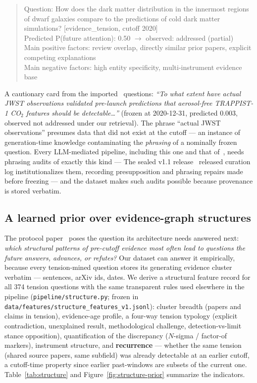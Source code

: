 \documentclass[11pt]{article}
\begin{document}
\begin{quote}\small\ttfamily\raggedright
Question: How does the dark matter distribution in the innermost regions
of dwarf galaxies compare to the predictions of cold dark matter
simulations? [evidence\_tension, cutoff 2020]\\
Predicted P(future attention): 0.50 $\rightarrow$ observed: addressed
(partial)\\
Main positive factors: review overlap, directly similar prior papers,
explicit competing explanations\\
Main negative factors: high entity specificity, multi-instrument
evidence base
\end{quote}

A cautionary card from the imported~\cite{paper1} questions: \emph{``To what extent have
actual JWST observations validated pre-launch predictions that
aerosol-free TRAPPIST-1 CO$_2$ features should be detectable\ldots''}
(frozen at 2020-12-31, predicted 0.003, observed not addressed under our
retrieval). The phrase ``actual JWST observations'' presumes data that
did not exist at the cutoff --- an instance of generation-time knowledge
contaminating the \emph{phrasing} of a nominally frozen question. Every
LLM-mediated pipeline, including this one and that of~\cite{paper1}, needs phrasing
audits of exactly this kind --- The sealed v1.1 release~\cite{paper2} released curation log
institutionalizes them, recording presupposition and phrasing repairs
made before freezing --- and the dataset makes such audits possible
because provenance is stored verbatim.

\subsection{A learned prior over evidence-graph structures}
\label{sec:structureprior}

The protocol paper~\cite{paper2} poses the question its architecture needs
answered next: \emph{which structural patterns of pre-cutoff evidence
most often lead to questions the future answers, advances, or refutes?}
Our dataset can answer it empirically, because every tension-mined
question stores its generating evidence cluster verbatim --- sentences,
arXiv ids, dates. We derive a structural feature record for all 374
tension questions with the same transparent rules used elsewhere in the
pipeline (\texttt{pipeline/structure.py}; frozen in
\texttt{data/features/structure\_features\_v1.jsonl}): cluster breadth
(papers and claims in tension), evidence-age profile, a four-way tension
typology (explicit contradiction, unexplained result, methodological
challenge, detection-vs-limit stance opposition), quantification of the
discrepancy ($N$-sigma / factor-of markers), instrument structure, and
\textbf{recurrence} --- whether the same tension (shared source papers,
same subfield) was already detectable at an earlier cutoff, a
cutoff-time property since earlier past-windows are subsets of the
current one. Table~\ref{tab:structure} and
Figure~\ref{fig:structure-prior} summarize the indicators.
\end{document}
